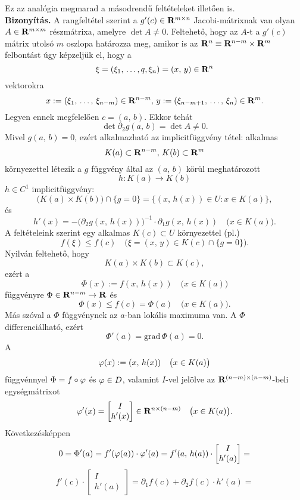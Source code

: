 Ez az analógia megmarad a másodrendű feltételeket illetően is.\\

\textbf{Bizonyítás.} A rangfeltétel szerint a $g'(c) \in \mathbf{R}^{m\times n}$ Jacobi-mátrixnak van olyan $A \in \mathbf{R}^{m \times m}$ részmátrixa, amelyre $\det A \neq 0$. Feltehető, hogy az $A$-t a $g'(c)$ mátrix utolsó $m$ oszlopa határozza meg, amikor is az $\mathbf{R}^n \equiv \mathbf{R}^{n-m} \times \mathbf{R}^{m}$ felbontást úgy képzeljük el, hogy a
\[
	\xi = (\xi_1, \, \dots, q, \xi_n) = (x, \, y) \in \mathbf{R}^n
\]
vektorokra
\[
	x := (\xi_1, \, \dots, \, \xi_{n-m}) \in \mathbf{R}^{n-m}, \, y := (\xi_{n-m+1}, \, \dots, \, \xi_n) \in \mathbf{R}^m.
\]
Legyen ennek megfelelően $c = (a, \, b)$. Ekkor tehát
\[
	\det \partial_2g(a, \, b) = \det A \neq 0.
\]
Mivel $g(a, \, b) = 0$, ezért alkalmazható az implicitfüggvény tétel: alkalmas
\[
	K(a) \subset \mathbf{R}^{n-m}, \, K(b) \subset \mathbf{R}^m
\]
környezettel létezik a $g$ függvény által az $(a, \, b)$ körül meghatározott
\[
	h : K(a) \to K(b)
\]
$h \in C^1$ implicitfüggvény:
\[
	\big( K(a) \times K(b) \big) \cap \{ g = 0\} = \{ (x, \, h(x)) \in U : x \in K(a)\},
\]
és
\[
	h'(x) = - \big( \partial_2g(x, \, h(x)) \big)^{-1} \cdot \partial_1g(x, \, h(x)) \quad \big( x \in K(a) \big).
\]
A feltételeink szerint egy alkalmas $K(c) \subset U$ környezettel (pl.)
\[
	f(\xi) \leq f(c) \quad \big(\xi = (x, \, y) \in K(c) \cap \{g=0\}\big).
\]
Nyilván feltehető, hogy
\[
	K(a) \times K(b) \subset K(c),
\]
ezért a
\[
	\Phi(x) := f(x, \, h(x)) \quad \big( x \in K(a) \big)
\]
függvényre $\Phi \in \mathbf{R}^{n-m} \to \mathbf{R}$ és
\[
	\Phi(x) \leq f(c) = \Phi(a) \quad \big( x \in K(a) \big).
\]
Más szóval a $\Phi$ függvénynek az $a$-ban lokális maximuma van. A $\Phi$ differenciálható, ezért
\[
	\Phi'(a) = \text{grad} \, \Phi(a) = 0.
\]
A
\[
	\varphi(x) := (x, \, h(x)) \quad \big(x \in K(a)\big)
\]
függvénnyel $\Phi = f \circ \varphi$ és $\varphi \in D$, valamint $I$-vel jelölve az $\mathbf{R}^{(n-m) \times (n-m)}$-beli egységmátrixot
\[
	\varphi'(x) = \begin{bmatrix}
		I\\
		h'(x)
	\end{bmatrix} \in \mathbf{R}^{n \times (n-m)} \quad \big(x \in K(a)\big).
\]
Következésképpen
\[
	0 = \Phi'(a) = f'(\varphi(a)) \cdot \varphi'(a) = f'(a, \, h(a)) \cdot \begin{bmatrix}
		I\\
		h'(a)
	\end{bmatrix} =
\]
\[
	f'(c) \cdot \begin{bmatrix}
		I\\
		h'(a)
	\end{bmatrix} = \partial_1f(c) + \partial_2f(c) \cdot h'(a) =
\]
